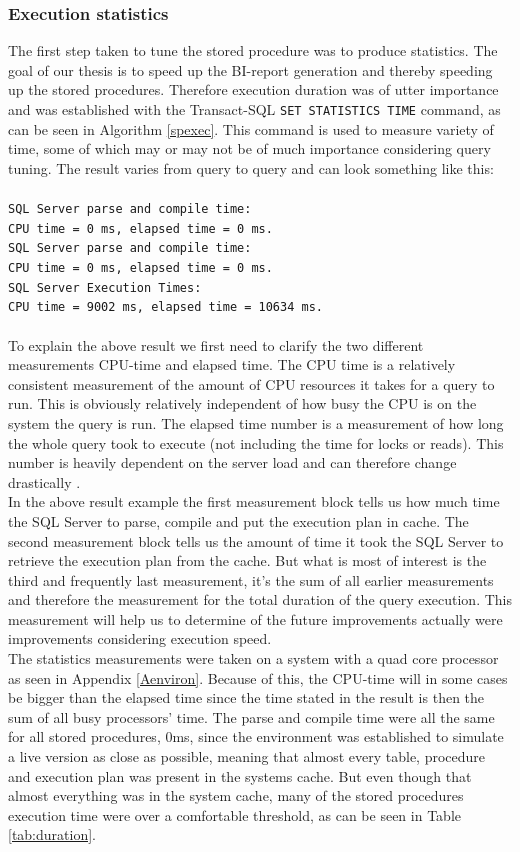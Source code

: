 \documentclass{cslthse-msc}
\begin{document}
\subsubsection{Execution statistics}
The first step taken to tune the stored procedure was to produce statistics. The goal of our thesis is to speed up the BI-report generation and thereby speeding up the stored procedures. Therefore execution duration was of utter importance and was established with the Transact-SQL \texttt{SET STATISTICS TIME} command, as can be seen in Algorithm \ref{spexec}. This command is used to measure variety of time, some of which may or may not be of much importance considering query tuning. The result varies from query to query and can look something like this: \\\\\texttt{SQL Server parse and compile time:\\
CPU time = 0 ms, elapsed time = 0 ms.\\
SQL Server parse and compile time:\\
CPU time = 0 ms,  elapsed time = 0 ms.\\
SQL Server Execution Times:\\
CPU time = 9002 ms,  elapsed time = 10634 ms.
}\\\\
To explain the above result we first need to clarify the two different measurements CPU-time and elapsed time. The CPU time is a relatively consistent measurement of the amount of CPU resources it takes for a query to run. This is obviously relatively independent of how busy the CPU is on the system the query is run. The elapsed time number is a measurement of how long the whole query took to execute (not including the time for locks or reads). This number is heavily dependent on the server load and can therefore change drastically    \cite{statistics}. \\ In the above result example the first measurement block tells us how much time the SQL Server to parse, compile and put the execution plan in cache. The second measurement block tells us the amount of time it took the SQL Server to retrieve the execution plan from the cache. But what is most of interest is the third and frequently last measurement, it's the sum of all earlier measurements and therefore the measurement for the total duration of the query execution. This measurement will help us to determine of the future improvements actually were improvements considering execution speed.\\
The statistics measurements were taken on a system with a quad core processor as seen in Appendix \ref{Aenviron}. Because of this, the CPU-time will in some cases be bigger than the elapsed time since the time stated in the result is then the sum of all busy processors' time. The parse and compile time were all the same for all stored procedures, 0ms, since the environment was established to simulate a live version as close as possible, meaning that almost every table, procedure and execution plan was present in the systems cache. But even though that almost everything was in the system cache, many of the stored procedures execution time were over a comfortable threshold, as can be seen in Table \ref{tab:duration}. 
\end{document}
